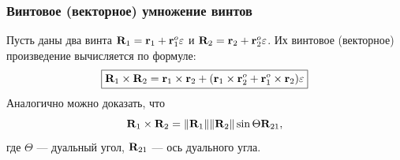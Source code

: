 \begin{frame}
  \frametitle{Винтовое (векторное) умножение винтов}
  Пусть даны два винта $\vb{R}_1 = \vb{r}_1 + \vb{r}^{o}_1 \varepsilon$ и $\vb{R}_2 = \vb{r}_2 + \vb{r}^{o}_2 \varepsilon$. Их винтовое (векторное) произведение вычисляется по формуле:
  \begin{equation*}
    \boxed{
    \vb{R}_1 \times \vb{R}_2 = 
    \vb{r}_1 \times \vb{r}_2 + (\vb{r}_1 \times \vb{r}^{o}_2 + \vb{r}^{o}_1 \times \vb{r}_2)\varepsilon
    }
  \end{equation*}
  Аналогично можно доказать, что
  \begin{equation*}
    \vb{R}_1 \times \vb{R}_2 = \norm{\vb{R}_1}\norm{\vb{R}_2}\sin\Theta \vb{R}_{21},
  \end{equation*}
  где $\Theta$ — дуальный угол, $\vb{R}_{21}$ — ось дуального угла.
\end{frame}

